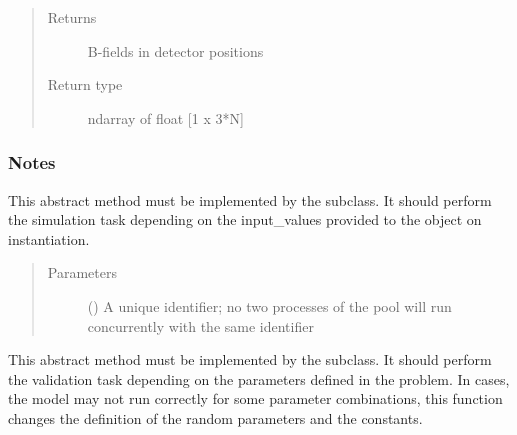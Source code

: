 \documentclass[letterpaper,10pt,english,openany,oneside]{sphinxmanual}
\begin{document}
\begin{fulllineitems}
\begin{quote}
\begin{description}
\begin{itemize}
\end{itemize}

\item[{Returns}] \leavevmode
{} \textendash{} B-fields in detector positions

\item[{Return type}] \leavevmode
ndarray of float {[}1 x 3*N{]}

\end{description}\end{quote}
\subsubsection*{Notes}

\begin{fulllineitems}
\label{\detokenize{pygpc.testfunctions:pygpc.testfunctions.testfunctions.BfieldOutsideSphere.simulate}}
This abstract method must be implemented by the subclass.
It should perform the simulation task depending on the input\_values provided to the object on instantiation.
\begin{quote}\begin{description}
\item[{Parameters}] \leavevmode
{} () \textendash{} A unique identifier; no two processes of the pool will run concurrently with the same identifier

\end{description}\end{quote}

\end{fulllineitems}


\begin{fulllineitems}
\label{\detokenize{pygpc.testfunctions:pygpc.testfunctions.testfunctions.BfieldOutsideSphere.validate}}
This abstract method must be implemented by the subclass.
It should perform the validation task depending on the parameters defined in the problem.
In cases, the model may not run correctly for some parameter combinations, this function changes the definition
of the random parameters and the constants.

\end{fulllineitems}


\end{fulllineitems}
\end{document}

